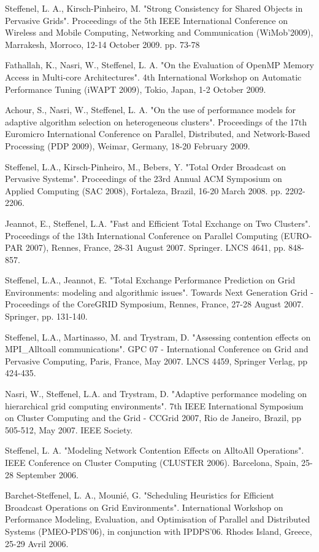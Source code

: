 \documentclass[final,twoside]{hdr} %
\begin{document}
Steffenel, L. A., Kirsch-Pinheiro, M. "Strong Consistency for Shared Objects in Pervasive Grids". Proceedings of the 5th IEEE International Conference on Wireless and Mobile Computing, Networking and Communication (WiMob'2009), Marrakesh, Morroco, 12-14 October 2009. pp. 73-78 

Fathallah, K., Nasri, W., Steffenel, L. A. "On the Evaluation of OpenMP Memory Access in Multi-core Architectures". 4th International Workshop on Automatic Performance Tuning (iWAPT 2009), Tokio, Japan, 1-2 October 2009. 

Achour, S., Nasri, W., Steffenel, L. A. "On the use of performance models for adaptive algorithm selection on heterogeneous clusters". Proceedings of the 17th Euromicro International Conference on Parallel, Distributed, and Network-Based Processing (PDP 2009), Weimar, Germany, 18-20 February 2009. 

Steffenel, L.A., Kirsch-Pinheiro, M., Bebers, Y. "Total Order Broadcast on Pervasive Systems". Proceedings of the 23rd Annual ACM Symposium on Applied Computing (SAC 2008), Fortaleza, Brazil, 16-20 March 2008. pp. 2202-2206. 

Jeannot, E., Steffenel, L.A. "Fast and Efficient Total Exchange on Two Clusters". Proceedings of the 13th International Conference on Parallel Computing (EURO-PAR 2007), Rennes, France, 28-31 August 2007. Springer. LNCS 4641, pp. 848-857. 

Steffenel, L.A., Jeannot, E. "Total Exchange Performance Prediction on Grid Environments: modeling and algorithmic issues". Towards Next Generation Grid - Proceedings of the CoreGRID Symposium, Rennes, France, 27-28 August 2007. Springer, pp. 131-140.

Steffenel, L.A., Martinasso, M. and Trystram, D. "Assessing contention effects on MPI\_Alltoall communications". GPC 07 - International Conference on Grid and Pervasive Computing, Paris, France, May 2007. LNCS 4459, Springer Verlag, pp 424-435.

Nasri, W., Steffenel, L.A. and Trystram, D. "Adaptive performance modeling on hierarchical grid computing environments". 7th IEEE International Symposium on Cluster Computing and the Grid - CCGrid 2007, Rio de Janeiro, Brazil, pp 505-512, May 2007. IEEE Society.

Steffenel, L. A. "Modeling Network Contention Effects on AlltoAll Operations". IEEE Conference on Cluster Computing (CLUSTER 2006). Barcelona, Spain, 25-28 September 2006. 

Barchet-Steffenel, L. A., Mounié, G. "Scheduling Heuristics for Efficient Broadcast Operations on Grid Environments". International Workshop on Performance Modeling, Evaluation, and Optimisation of Parallel and Distributed Systems (PMEO-PDS'06), in conjunction with IPDPS'06. Rhodes Island, Greece, 25-29 Avril 2006.
\end{document}
